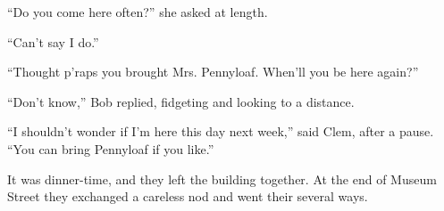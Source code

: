``Do you come here often?'' she asked at length.

``Can't say I do.''

``Thought p'raps you brought Mrs. Pennyloaf. When'll you be here
again?''

``Don't know,'' Bob replied, fidgeting and looking to a distance.

``I shouldn't wonder if I'm here this day next week,'' said Clem, after
a pause. ``You can bring Pennyloaf if you like.''

It was dinner-time, and they left the building together. At the end of
Museum Street they exchanged a careless nod and went their several ways.
